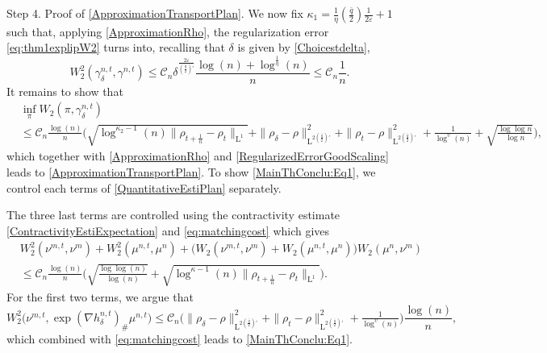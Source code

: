 \documentclass[11pt,a4paper,oneside]{amsart}
\numberwithin{equation}{section}
\newcommand{\LL}{\mathrm{L}}
\begin{document}
%
\medskip
%

{\sc Step 4. Proof of \eqref{ApproximationTransportPlan}. }
%
We now fix $\kappa_1=\frac{1}{\eta}(\tfrac{\bar q}{2})\frac{1}{2\varepsilon}+1$ such that, applying \eqref{ApproximationRho}, the regularization error \eqref{eq:thm1explipW2} turns into, recalling that $\delta$ is given by \eqref{Choicestdelta}, 
%
\begin{equation}\label{RegularizedErrorGoodScaling}
%
W^2_2(\gamma^{n,t}_\delta,\gamma^{n,t})\leq \mathcal{C}_n\delta^{\frac{2\varepsilon}{(\frac{\bar q}{2})'}}\frac{\log(n)+\log^{\frac{1}{\eta}}(n)}{n}\leq \mathcal{C}_n\frac{1}{n}.
%
\end{equation}
%
It remains to show that 
%
\begin{equation}\label{MainThConclu:Eq1}
%
\begin{aligned}
&\inf_\pi W_2(\pi,\gamma^{n,t}_\delta)\\
&\leq \mathcal{C}_n\frac{\log(n)}{n} \Big(\sqrt{\log^{\kappa_2-1}(n)\|\rho_{t+\frac{1}{n}}-\rho_t\|_{\LL^1}}+\|\rho_\delta-\rho\|^2_{\LL^{2(\frac{\bar{q}}{2})'}}+\|\rho_t-\rho\|^2_{\LL^{2(\frac{\bar{q}}{2})'}}+\tfrac{1}{\log^{\upsilon}(n)}+\sqrt{\tfrac{\log\log n}{\log n}}\Big),
\end{aligned}
%
\end{equation}
%
which together with \eqref{ApproximationRho} and \eqref{RegularizedErrorGoodScaling} leads to \eqref{ApproximationTransportPlan}. To show \eqref{MainThConclu:Eq1}, we control each terms of \eqref{QuantitativeEstiPlan} separately. 

%
\medskip
%

The three last terms are controlled using the contractivity estimate \eqref{ContractivityEstiExpectation} and \eqref{eq:matchingcost} which gives 
%
\begin{align*}
%
&W^2_2(\nu^{m,t},\nu^{m})+W^2_2(\mu^{n,t},\mu^{n})+\big(W_2(\nu^{m,t},\nu^m)+W_2(\mu^{n,t},\mu^n)\big)W_2(\mu^n,\nu^m)\\
&\leq \mathcal{C}_n\frac{\log(n)}{n}\bigg(\sqrt{\frac{\log\log(n)}{\log(n)}}+\sqrt{\log^{\kappa-1}(n)\|\rho_{t+\frac{1}{n}}-\rho_t\|_{\LL^1}}\bigg).
%
\end{align*}
%
For the first two terms, we argue that 
%
\begin{equation}\label{MainResultConclu:Eq2}
%
W^2_2\big(\nu^{m,t},\exp(\nabla h^{n,t}_\delta)_\#\mu^{n,t}\big)\leq \mathcal{C}_n\big(\|\rho_{\delta}-\rho\|^{2}_{\LL^{2(\frac{\bar q}{2})'}}+\|\rho_{t}-\rho\|^{2}_{\LL^{2(\frac{\bar q}{2})'}}+\tfrac{1}{\log^{\upsilon}(n)}\big)\frac{\log(n)}{n},
%
\end{equation}
%
which combined with \eqref{eq:matchingcost} leads to \eqref{MainThConclu:Eq1}.
%
\end{document}
